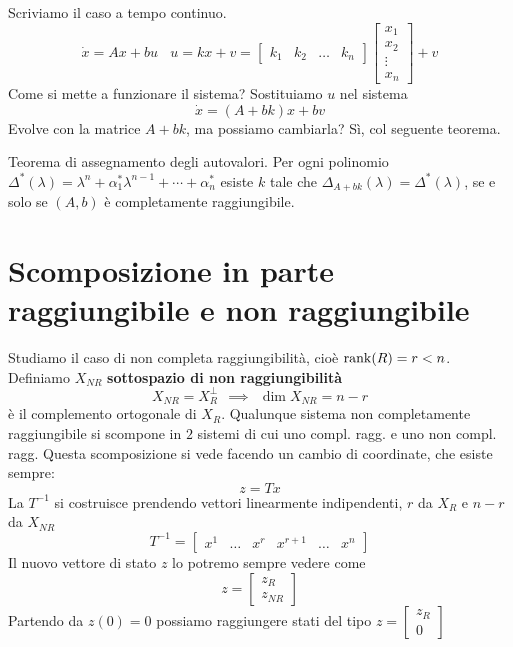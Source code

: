 Scriviamo il caso a tempo continuo.
\begin{equation*}
	\dot{x} =Ax+bu\ \ \ \ \boxed{u=kx+v} =\begin{bmatrix}
	k_1 & k_2 & \dotsc  & k_n
	\end{bmatrix}\begin{bmatrix}
	x_1\\
	x_2\\
	\vdots \\
	x_n
	\end{bmatrix} +v
\end{equation*}
Come si mette a funzionare il sistema? Sostituiamo $u$ nel sistema
\begin{equation*}
	\boxed{\dot{x} =(A+bk) x+bv}
\end{equation*}
Evolve con la matrice $A+bk$, ma possiamo cambiarla? Sì, col seguente teorema.
\begin{thm}
	Teorema di assegnamento degli autovalori. Per ogni polinomio $\Delta ^{*}(\lambda) =\lambda ^n +\alpha ^{*}_1 \lambda ^{n-1} +\cdots +\alpha ^{*}_n$ esiste $k$ tale che $\Delta _{A+bk}(\lambda) =\Delta ^{*}(\lambda)$, se e solo se $(A,b)$ è completamente raggiungibile.
\end{thm}

\section{Scomposizione in parte raggiungibile e non raggiungibile}

Studiamo il caso di non completa raggiungibilità, cioè $\operatorname*{rank}(R) =r< n$. Definiamo $X_{NR}$ \textbf{sottospazio di non raggiungibilità}
\begin{equation*}
	X_{NR} =X^{\perp }_R \ \ \implies \ \ \dim X_{NR} =n-r
\end{equation*}
è il complemento ortogonale di $X_R$. Qualunque sistema non completamente raggiungibile si scompone in $2$ sistemi di cui uno compl. ragg. e uno non compl. ragg. Questa scomposizione si vede facendo un cambio di coordinate, che esiste sempre:
\begin{equation*}
	z=Tx
\end{equation*}
La $T^{-1}$ si costruisce prendendo vettori linearmente indipendenti, $r$ da $X_R$ e $n-r$ da $X_{NR}$
\begin{equation*}
	T^{-1} =\begin{bmatrix}
	x^1 & \dotsc  & x^r & x^{r+1} & \dotsc  & x^n
	\end{bmatrix}
\end{equation*}
Il nuovo vettore di stato $z$ lo potremo sempre vedere come
\begin{equation*}
	z=\begin{bmatrix}
	z_R\\
	z_{NR}
	\end{bmatrix}
\end{equation*}
Partendo da $z(0) =0$ possiamo raggiungere stati del tipo $z=\begin{bmatrix}
z_R\\
0
\end{bmatrix}$

